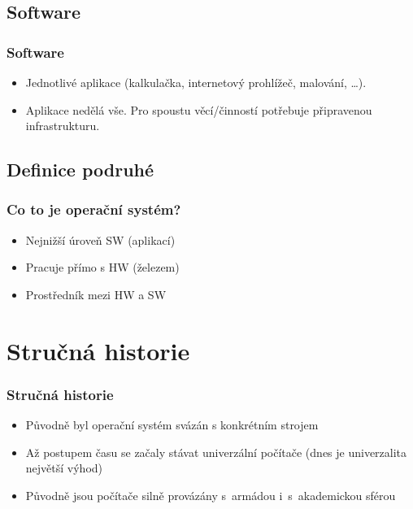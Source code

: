 \documentclass[xetex]{beamer}
\begin{document}
\subsection{Software}
\begin{frame}
 \frametitle{Software}
 \begin{itemize}
  \item Jednotlivé aplikace (kalkulačka, internetový prohlížeč, malování, \ldots{}).
  \item Aplikace nedělá vše. Pro spoustu věcí/činností potřebuje připravenou infrastrukturu. 
 \end{itemize}
\end{frame}

\subsection{Definice podruhé}
\begin{frame}
 \frametitle{Co to je operační systém?}
 \begin{itemize}
  \item Nejnižší úroveň SW (aplikací)
  \item Pracuje přímo s HW (železem)
  \item Prostředník mezi HW a SW
 \end{itemize}
\end{frame}


\section{Stručná historie}

\begin{frame}
 \frametitle{Stručná historie}
 \begin{itemize}
  \item Původně byl operační systém svázán s konkrétním strojem
  \item Až postupem času se začaly stávat univerzální počítače (dnes je univerzalita největší výhod)
  \item Původně jsou počítače silně provázány s~armádou i~s~akademickou sférou
 \end{itemize}
\end{frame}
\end{document}
